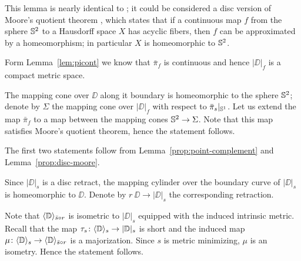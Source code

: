 This lemma is nearly identical to \cite[Corollary 7.12]{LW3}; it could be considered a disc version of Moore's quotient theorem \cite{moore}, \cite{daverman}
which states that if a continuous map $f$ from the sphere $\mathbb{S}^2$ to a Hausdorff space $X$
has acyclic fibers, then $f$ can be approximated by a homeomorphism;
in particular $X$ is homeomorphic to $\mathbb{S}^2$.

Form Lemma~\ref{lem:picont} we know that $\bar\pi_f$ is continuous and hence $|\DD|_f$
is a compact metric space. 


The mapping cone over $\DD$ along it boundary is homeomorphic to the sphere $\mathbb{S}^2$;
denote by $\Sigma$ the mapping cone over $|\DD|_f$ with respect to $\bar\pi_s|_{\mathbb{S}^1}$.
Let us extend the map $\bar\pi_f$ to a map between the mapping cones $\mathbb{S}^2\to\Sigma$.
Note that this map satisfies Moore's quotient theorem, hence the statement follows.
\qeds

The first two statements follow from Lemma~\ref{prop:point-complement} and Lemma~\ref{prop:disc-moore}.

Since $|\DD|_s$ is a disc retract, the mapping cylinder over the boundary curve of $|\DD|_s$ is homeomorphic to $\DD$.
Denote by $r \:\DD\to |\DD|_s$ the corresponding retraction.

Note that $\langle\mathbb{D}\rangle_{\bar s\circ r}$ is isometric to $|\DD|_s$ equipped with the induced intrinsic metric.
Recall that the map $\tau_s\colon\langle\mathbb{D}\rangle_s\to|\mathbb{D}|_s$ is short and the induced map $\mu\colon\langle\mathbb{D}\rangle_s\to\langle\mathbb{D}\rangle_{\bar s\circ r}$ is a majorization.
Since $s$ is metric minimizing, $\mu$ is an isometry.
Hence the statement follows.
\qeds
